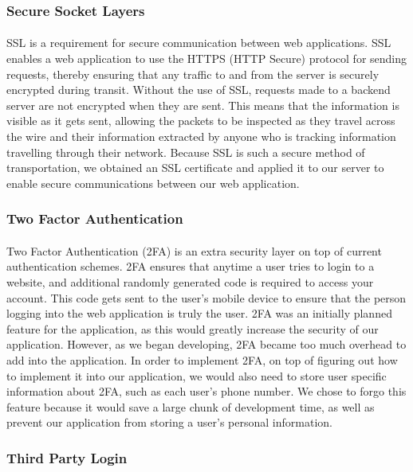 \documentclass[12pt]{article}
\begin{document}
	\subsubsection{Secure Socket Layers}	
	\paragraph{}
		SSL is a requirement for secure communication between web applications. SSL enables a web application to use the HTTPS (HTTP Secure) protocol for sending requests, thereby ensuring that any traffic to and from the server is securely encrypted during transit. Without the use of SSL, requests made to a backend server are not encrypted when they are sent. This means that the information is visible as it gets sent, allowing the packets to be inspected as they travel across the wire and their information extracted by anyone who is tracking information travelling through their network. Because SSL is such a secure method of transportation, we obtained an SSL certificate and applied it to our server to enable secure communications between our web application.
	
	\subsubsection{Two Factor Authentication}
	\paragraph{}
		Two Factor Authentication (2FA) is an extra security layer on top of current authentication schemes. 2FA ensures that anytime a user tries to login to a website, and additional randomly generated code is required to access your account. This code gets sent to the user's mobile device to ensure that the person logging into the web application is truly the user. 2FA was an initially planned feature for the application, as this would greatly increase the security of our application. However, as we began developing, 2FA became too much overhead to add into the application. In order to implement 2FA, on top of figuring out how to implement it into our application, we would also need to store user specific information about 2FA, such as each user's phone number. We chose to forgo this feature because it would save a large chunk of development time, as well as prevent our application from storing a user's personal information.
	
	\subsubsection{Third Party Login}
\end{document}
